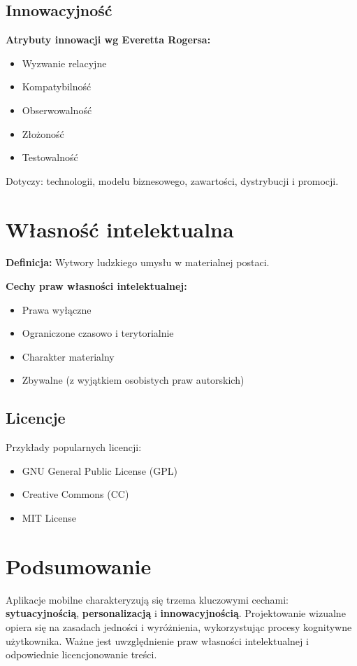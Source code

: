 \subsection{Innowacyjność}
\textbf{Atrybuty innowacji wg Everetta Rogersa:}
\begin{itemize}[noitemsep]
    \item Wyzwanie relacyjne
    \item Kompatybilność
    \item Obserwowalność
    \item Złożoność
    \item Testowalność
\end{itemize}

Dotyczy: technologii, modelu biznesowego, zawartości, dystrybucji i promocji.

\section{Własność intelektualna}
\textbf{Definicja:} Wytwory ludzkiego umysłu w materialnej postaci.

\textbf{Cechy praw własności intelektualnej:}
\begin{itemize}[noitemsep]
    \item Prawa wyłączne
    \item Ograniczone czasowo i terytorialnie
    \item Charakter materialny
    \item Zbywalne (z wyjątkiem osobistych praw autorskich)
\end{itemize}

\subsection{Licencje}
Przykłady popularnych licencji:
\begin{itemize}[noitemsep]
    \item GNU General Public License (GPL)
    \item Creative Commons (CC)
    \item MIT License
\end{itemize}

\section{Podsumowanie}
Aplikacje mobilne charakteryzują się trzema kluczowymi cechami: \textbf{sytuacyjnością}, \textbf{personalizacją} i \textbf{innowacyjnością}. Projektowanie wizualne opiera się na zasadach jedności i wyróżnienia, wykorzystując procesy kognitywne użytkownika. Ważne jest uwzględnienie praw własności intelektualnej i odpowiednie licencjonowanie treści.


